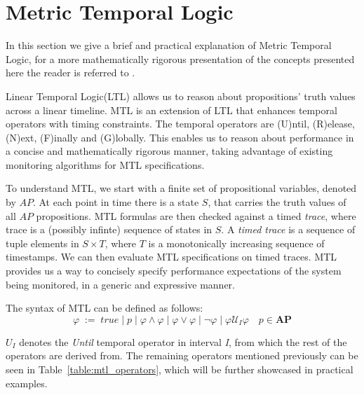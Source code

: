 \documentclass[twocolumn]{article}
\begin{document}
\section{Metric Temporal Logic}
In this section we give a brief and practical explanation of Metric Temporal Logic, for a more mathematically rigorous presentation of the concepts presented here the reader is referred to \cite{hendriks_checking_2016,dhananjayan_metric_2014,thati_monitoring_2005,pnueli_temporal_1977}.
\par
Linear Temporal Logic(LTL) \cite{pnueli_temporal_1977} allows us to reason about propositions' truth values across a linear timeline.
MTL \cite{koymans_specifying_1990} is an extension of LTL that enhances temporal operators with timing constraints. The temporal operators are (U)ntil, (R)elease, (N)ext, (F)inally and (G)lobally.
This enables us to reason about performance in a concise and mathematically rigorous manner, taking advantage of existing
monitoring algorithms for MTL specifications.

\par
To understand MTL, we start with a finite set of propositional variables, denoted by $AP$.
At each point in time there is a state $S$, that carries the truth values of all $AP$ propositions.
MTL formulas are then checked against a timed \emph{trace}, where trace is a (possibly infinte) sequence of states in $S$.
A \emph{timed trace} is a sequence of tuple elements in $S \times T$, where $T$ is a monotonically increasing sequence of timestamps.
We can then evaluate MTL specifications on timed traces.
MTL provides us a way to concisely specify performance expectations of the system being monitored, in a generic and expressive manner.

\par
The syntax of MTL can be defined as follows:
\[
	\varphi \; := \; true \; | \; p \; | \; \varphi \land \varphi \; | \; \varphi \lor \varphi \;| \; \neg \varphi \; | \; \varphi \mathcal{U}_I \varphi \quad p \in \mathbf{AP}
\]

$U_I$ denotes the \emph{Until} temporal operator in interval \emph{I}, from which the rest of the operators are derived from.
The remaining operators mentioned previously can be seen in Table~\ref{table:mtl_operators}, which will
be further showcased in practical examples.
\end{document}
